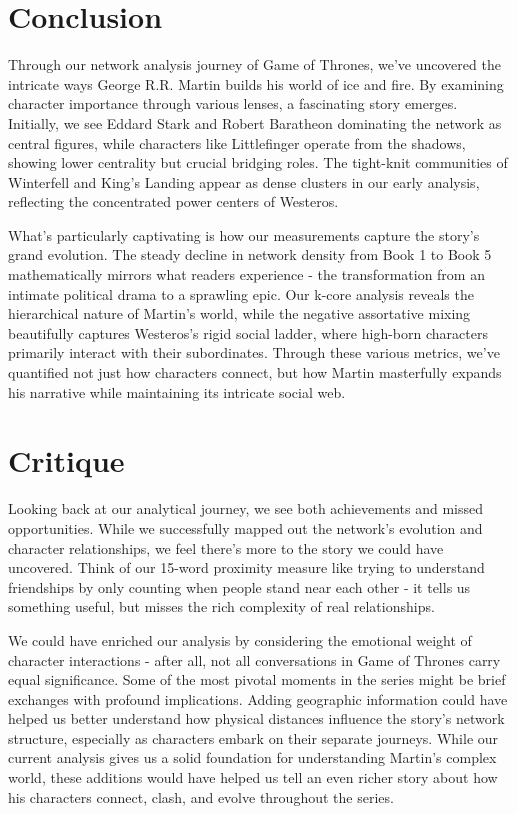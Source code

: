 \documentclass[12pt, a4paper]{article}
\begin{document}
\section{Conclusion}
Through our network analysis journey of Game of Thrones, we've uncovered the intricate ways George R.R. Martin builds his world of ice and fire. By examining character importance through various lenses, a fascinating story emerges. Initially, we see Eddard Stark and Robert Baratheon dominating the network as central figures, while characters like Littlefinger operate from the shadows, showing lower centrality but crucial bridging roles. The tight-knit communities of Winterfell and King's Landing appear as dense clusters in our early analysis, reflecting the concentrated power centers of Westeros.

What's particularly captivating is how our measurements capture the story's grand evolution. The steady decline in network density from Book 1 to Book 5 mathematically mirrors what readers experience - the transformation from an intimate political drama to a sprawling epic. Our k-core analysis reveals the hierarchical nature of Martin's world, while the negative assortative mixing beautifully captures Westeros's rigid social ladder, where high-born characters primarily interact with their subordinates. Through these various metrics, we've quantified not just how characters connect, but how Martin masterfully expands his narrative while maintaining its intricate social web.

\section{Critique}
Looking back at our analytical journey, we see both achievements and missed opportunities. While we successfully mapped out the network's evolution and character relationships, we feel there's more to the story we could have uncovered. Think of our 15-word proximity measure like trying to understand friendships by only counting when people stand near each other - it tells us something useful, but misses the rich complexity of real relationships. 

We could have enriched our analysis by considering the emotional weight of character interactions - after all, not all conversations in Game of Thrones carry equal significance. Some of the most pivotal moments in the series might be brief exchanges with profound implications. Adding geographic information could have helped us better understand how physical distances influence the story's network structure, especially as characters embark on their separate journeys. While our current analysis gives us a solid foundation for understanding Martin's complex world, these additions would have helped us tell an even richer story about how his characters connect, clash, and evolve throughout the series.
\end{document}
